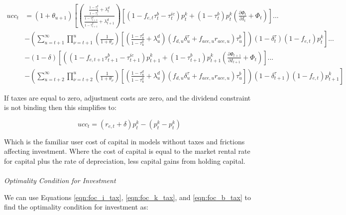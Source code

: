 \begin{equation}
\begin{split}
ucc_{t} &=  \left({1+\theta_{u+1}}\right)\left[\left(\frac{\frac{1-\tau^{d}_{t}}{1-\tau^{g}_{t}} + \lambda^{d}_{t}}{\frac{1-\tau^{d}_{t+1}}{1-\tau^{g}_{t+1}} + \lambda^{d}_{t+1}}\right)\left[(1-f_{e,t}\tau^{b}_{t}-\tau^{ic}_{t})p^{k}_{t}+ (1-\tau^{b}_{t})p^{k}_{t}\left(\frac{\partial \Phi_{t}}{\partial I_{t}} + \Phi_{t}\right)\right]... \right. \\
& \left. -  \left( \sum_{u=t+1}^{\infty} \prod_{\nu=t+1}^{u}\left(\frac{1}{1+\theta_{\nu}}\right)\left[\left(\frac{1-\tau^{d}_{u}}{1-\tau^{g}_{u}}+\lambda^{d}_{u}\right)\left( f_{d,u}\delta^{\tau}_{u}+f_{ace,u}r_{ace,u} \right)\tau^{b}_{u}\right]\right) (1-\delta^{\tau}_{t})(1-f_{e,t})p^{k}_{t}\right] ...   \\
& - (1-\delta)\left[ \left((1-f_{e,t+1}\tau^{b}_{t+1}-\tau^{ic}_{t+1})p^{k}_{t+1}+ (1-\tau^{b}_{t+1})p^{k}_{t+1}\left(\frac{\partial \Phi_{t+1}}{\partial I_{t+1}} + \Phi_{t}\right)\right] ... \right. \\
& \left. - \left(  \sum_{u=t+2}^{\infty} \prod_{\nu=t+2}^{u}\left(\frac{1}{1+\theta_{\nu}}\right)\left[\left(\frac{1-\tau^{d}_{u}}{1-\tau^{g}_{u}}+\lambda^{d}_{u}\right)\left( f_{d,u}\delta^{\tau}_{u}+f_{ace,u}r_{ace,u} \right)\tau^{b}_{u}\right] \right)(1-\delta^{\tau}_{t+1})(1-f_{e,t})p^{k}_{t+1}\right]
\end{split}
\end{equation}

If taxes are equal to zero, adjustment costs are zero, and the dividend constraint is not binding then this simplifies to:

\begin{equation}
ucc_{t}= (r_{e,t}+ \delta)p^{k}_{t} - (p^{k}_{t}-p^{k}_{t})
\end{equation}

Which is the familiar user cost of capital in models without taxes and frictions affecting investment.  Where the cost of capital is equal to the market rental rate for capital  plus the rate of depreciation, less capital gains from holding capital.\\

\ \\
\noindent\noindent \emph{Optimality Condition for Investment}

We can use Equations \ref{eqn:foc_i_tax}, \ref{eqn:foc_k_tax}, and \ref{eqn:foc_b_tax} to find the optimality condition for investment as:


